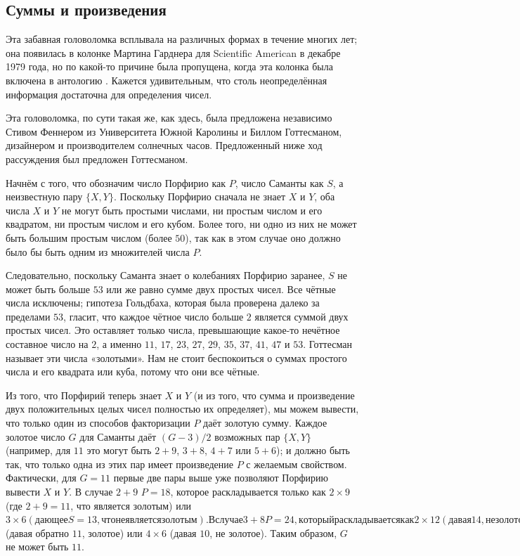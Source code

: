 \subsection*{Суммы и произведения}

Эта забавная головоломка всплывала на различных формах в течение многих лет; она появилась в колонке Мартина Гарднера для Scientific American в декабре 1979 года, но по какой-то причине была пропущена, когда эта колонка была включена в антологию \cite{29}.
Кажется удивительным, что столь неопределённая информация достаточна для определения чисел.

Эта головоломка, по сути такая же, как здесь, была предложена независимо Стивом Феннером из Университета Южной Каролины и Биллом Готтесманом, дизайнером и производителем солнечных часов. Предложенный ниже ход рассуждения был предложен Готтесманом.

Начнём с того, что обозначим число Порфирио как $P$, число Саманты как $S$, а неизвестную пару $\{X, Y\}$.
Поскольку Порфирио сначала не знает $X$ и $Y$, оба числа $X$ и $Y$ не могут быть простыми числами,
ни простым числом и его квадратом,
ни простым числом и его кубом.
Более того, ни одно из них не может быть большим простым числом (более $50$), так как в этом случае оно должно было бы быть одним из множителей числа $P$.

Следовательно, поскольку Саманта знает о колебаниях Порфирио заранее,
$S$ не может быть больше $53$ или же равно сумме двух простых чисел.
Все чётные числа исключены; гипотеза Гольдбаха, которая была проверена далеко за пределами $53$, гласит, что каждое чётное число больше $2$ является суммой двух простых чисел.
Это оставляет только числа, превышающие какое-то нечётное составное число на $2$, а именно $11$, $17$, $23$, $27$, $29$, $35$, $37$, $41$, $47$ и $53$.
Готтесман называет эти числа «золотыми».
Нам не стоит беспокоиться о суммах простого числа и его квадрата или куба, потому что они все чётные.

Из того, что Порфирий теперь знает $X$ и $Y$ (и из того, что сумма и произведение двух положительных целых чисел полностью их определяет), мы можем вывести, что только один из способов факторизации $P$ даёт золотую сумму. 
Каждое золотое число $G$ для Саманты даёт $(G - 3)/2$ возможных пар $\{X, Y\}$ (например, для $11$ это могут быть $2 + 9$, $3 + 8$, $4 + 7$ или $5 + 6$); и должно быть так, что только одна из этих пар имеет произведение $P$ с желаемым свойством.
Фактически, для $G = 11$ первые две пары выше уже позволяют Порфирию вывести $X$ и $Y$.
В случае $2 + 9$ $P = 18$, которое раскладывается только как $2 \times 9$ (где $2 + 9 = 11$, что является золотым) или $3 \times 6 (дающее S = 13, что не является золотым). В случае 3 + 8 P = 24, который раскладывается как 2 \times 12 (давая 14, не золотое) или 3 \times 8$ (давая обратно $11$, золотое) или $4 \times 6$ (давая $10$, не золотое).
Таким образом, $G$ не может быть $11$.

